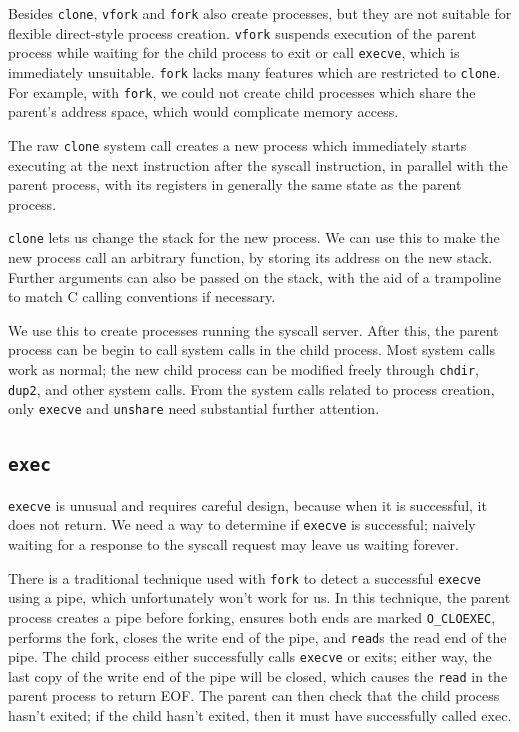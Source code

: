 \documentclass[letterpaper,twocolumn,10pt]{article}
\begin{document}
Besides \texttt{clone}, \texttt{vfork} and \texttt{fork} also create processes,
but they are not suitable for flexible direct-style process creation.
\texttt{vfork} suspends execution of the parent process
while waiting for the child process to exit or call \texttt{execve},
which is immediately unsuitable.
\texttt{fork} lacks many features which are restricted to \texttt{clone}.
For example, with \texttt{fork},
we could not create child processes which share the parent's address space,
which would complicate memory access.

The raw \texttt{clone} system call creates a new process
which immediately starts executing at the next instruction after the syscall instruction,
in parallel with the parent process,
with its registers in generally the same state as the parent process.

\texttt{clone} lets us change the stack for the new process.
We can use this to make the new process call an arbitrary function,
by storing its address on the new stack.
Further arguments can also be passed on the stack,
with the aid of a trampoline to match C calling conventions if necessary.

We use this to create processes running the syscall server.
After this,
the parent process can be begin to call system calls in the child process.
Most system calls work as normal;
the new child process can be modified freely through \texttt{chdir}, \texttt{dup2}, and other system calls.
From the system calls related to process creation,
only \texttt{execve} and \texttt{unshare} need substantial further attention.
\subsection{\texttt{exec}}\label{execve}
\texttt{execve} is unusual and requires careful design,
because when it is successful, it does not return.
We need a way to determine if \texttt{execve} is successful;
naively waiting for a response to the syscall request may leave us waiting forever.

There is a traditional technique used with \texttt{fork}
to detect a successful \texttt{execve} using a pipe,
which unfortunately won't work for us.
In this technique, the parent process creates a pipe before forking,
ensures both ends are marked \verb|O_CLOEXEC|,
performs the fork,
closes the write end of the pipe,
and \texttt{read}s the read end of the pipe.
The child process either successfully calls \texttt{execve} or exits;
either way, the last copy of the write end of the pipe will be closed,
which causes the \texttt{read} in the parent process to return EOF.
The parent can then check that the child process hasn't exited;
if the child hasn't exited, then it must have successfully called exec.
\end{document}

